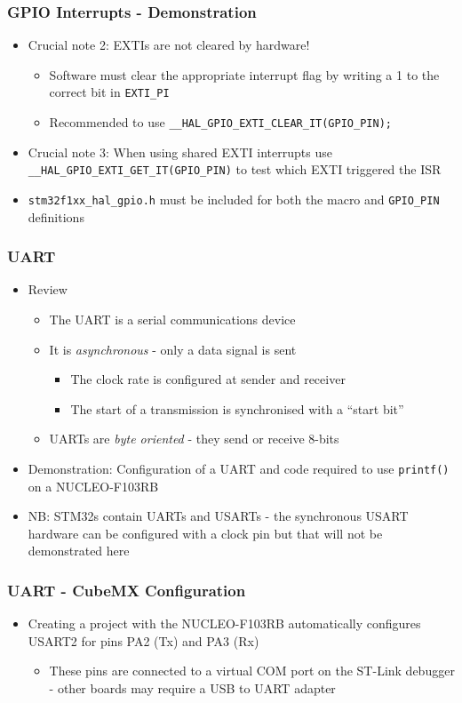 \documentclass[14pt]{beamer}
\begin{document}
\begin{frame}[fragile]
\frametitle{GPIO Interrupts - Demonstration}
\begin{itemize}
\item Crucial note 2: EXTIs are not cleared by hardware!
\begin{itemize}
\item Software must clear the appropriate interrupt flag by writing a 1 to the correct bit in \texttt{EXTI\_PI}
\item Recommended to use \texttt{\_\_HAL\_GPIO\_EXTI\_CLEAR\_IT(GPIO\_PIN);}
\end{itemize}
\item Crucial note 3: When using shared EXTI interrupts use \texttt{\_\_HAL\_GPIO\_EXTI\_GET\_IT(GPIO\_PIN)} to test which EXTI triggered the ISR
\item \texttt{stm32f1xx\_hal\_gpio.h} must be included for both the macro and \texttt{GPIO\_PIN} definitions
\end{itemize}
\end{frame}

\begin{frame}[fragile]
\frametitle{UART}
\begin{itemize}
\item Review
\begin{itemize}
\item The UART is a serial communications device
\item It is \textit{asynchronous} - only a data signal is sent
	\begin{itemize}
		\item The clock rate is configured at sender and receiver
		\item The start of a transmission is synchronised with a ``start bit''
	\end{itemize}
\item UARTs are \textit{byte oriented} - they send or receive 8-bits
\end{itemize}
\item Demonstration: Configuration of a UART and code required to use \texttt{printf()} on a NUCLEO-F103RB
\item NB: STM32s contain UARTs and USARTs - the synchronous USART hardware can be configured with a clock pin but that will not be demonstrated here
\end{itemize}
\end{frame}

\begin{frame}[fragile]
\frametitle{UART - CubeMX Configuration}
\begin{itemize}
\item Creating a project with the NUCLEO-F103RB automatically configures USART2 for pins PA2 (Tx) and PA3 (Rx)
	\begin{itemize}
		\item These pins are connected to a virtual COM port on the ST-Link debugger - other boards may require a USB to UART adapter
	\end{itemize}
\end{itemize}
\end{frame}
\end{document}
